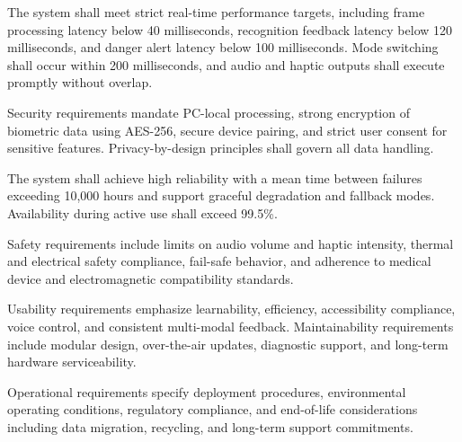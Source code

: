 The system shall meet strict real-time performance targets, including frame processing latency below 40 milliseconds, recognition feedback latency below 120 milliseconds, and danger alert latency below 100 milliseconds. Mode switching shall occur within 200 milliseconds, and audio and haptic outputs shall execute promptly without overlap.

Security requirements mandate PC-local processing, strong encryption of biometric data using AES-256, secure device pairing, and strict user consent for sensitive features. Privacy-by-design principles shall govern all data handling.

The system shall achieve high reliability with a mean time between failures exceeding 10,000 hours and support graceful degradation and fallback modes. Availability during active use shall exceed 99.5\%.

Safety requirements include limits on audio volume and haptic intensity, thermal and electrical safety compliance, fail-safe behavior, and adherence to medical device and electromagnetic compatibility standards.

Usability requirements emphasize learnability, efficiency, accessibility compliance, voice control, and consistent multi-modal feedback. Maintainability requirements include modular design, over-the-air updates, diagnostic support, and long-term hardware serviceability.

Operational requirements specify deployment procedures, environmental operating conditions, regulatory compliance, and end-of-life considerations including data migration, recycling, and long-term support commitments.
